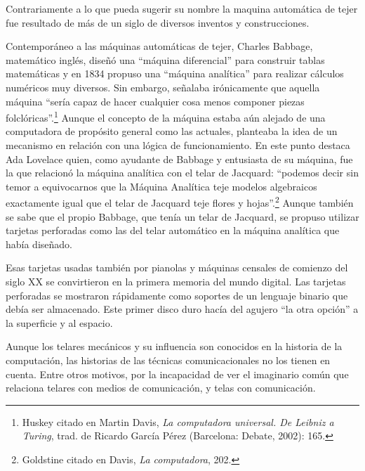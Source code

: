 \documentclass{tufte-handout}
\begin{document}
Contrariamente a lo que pueda sugerir su nombre la maquina automática de
tejer fue resultado de más de un siglo de diversos inventos y
construcciones.

Contemporáneo a las máquinas automáticas de tejer, Charles Babbage,
matemático inglés, diseñó una ``máquina diferencial'' para construir
tablas matemáticas y en 1834 propuso una ``máquina analítica'' para
realizar cálculos numéricos muy diversos. Sin embargo, señalaba
irónicamente que aquella máquina ``sería capaz de hacer cualquier cosa
menos componer piezas folclóricas''.\footnote{Huskey citado en Martin
  Davis, \emph{La computadora universal. De Leibniz a Turing}, trad. de
  Ricardo García Pérez (Barcelona: Debate, 2002): 165.} Aunque el
concepto de la máquina estaba aún alejado de una computadora de
propósito general como las actuales, planteaba la idea de un mecanismo
en relación con una lógica de funcionamiento. En este punto destaca Ada
Lovelace quien, como ayudante de Babbage y entusiasta de su máquina, fue
la que relacionó la máquina analítica con el telar de Jacquard:
``podemos decir sin temor a equivocarnos que la Máquina Analítica teje
modelos algebraicos exactamente igual que el telar de Jacquard teje
flores y hojas''.\footnote{Goldstine citado en Davis, \emph{La
  computadora}, 202.} Aunque también se sabe que el propio Babbage, que
tenía un telar de Jacquard, se propuso utilizar tarjetas perforadas como
las del telar automático en la máquina analítica que había diseñado.

Esas tarjetas usadas también por pianolas y máquinas censales de
comienzo del siglo XX se convirtieron en la primera memoria del mundo
digital. Las tarjetas perforadas se mostraron rápidamente como soportes
de un lenguaje binario que debía ser almacenado. Este primer disco duro
hacía del agujero ``la otra opción'' a la superficie y al espacio.

Aunque los telares mecánicos y su influencia son conocidos en la
historia de la computación, las historias de las técnicas
comunicacionales no los tienen en cuenta. Entre otros motivos, por la
incapacidad de ver el imaginario común que relaciona telares con medios
de comunicación, y telas con comunicación.
\end{document}
